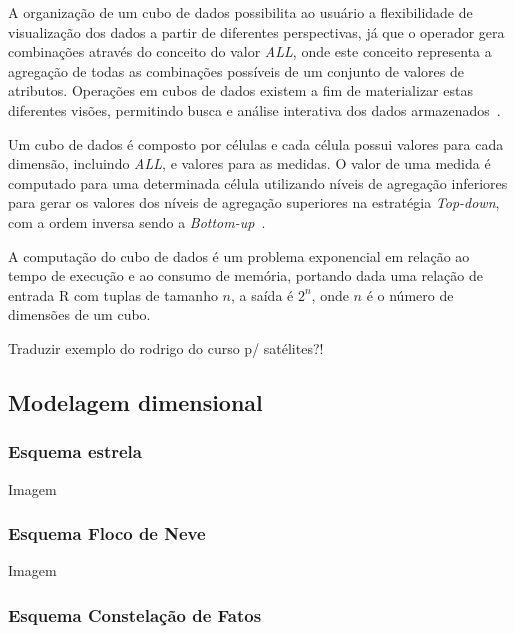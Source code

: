 A organização de um cubo de dados possibilita ao usuário a flexibilidade de visualização dos dados a partir de diferentes perspectivas, já que o operador gera combinações através do conceito do valor \textit{ALL}, onde este conceito representa a agregação de todas as combinações possíveis de um conjunto de valores de atributos.
Operações em cubos de dados existem a fim de materializar estas diferentes visões, permitindo busca e análise interativa dos dados armazenados~\cite{silva:2015:abordagensParaCubo}.

Um cubo de dados é composto por células e cada célula possui valores para cada dimensão, incluindo \textit{ALL}, e valores para as medidas.
O valor de uma medida é computado para uma determinada célula utilizando níveis de agregação inferiores para gerar os valores dos níveis de agregação superiores na estratégia \textit{Top-down}, com a ordem inversa sendo a \textit{Bottom-up}~\cite{silva:2015:abordagensParaCubo}.

A computação do cubo de dados é um problema exponencial em relação ao tempo de execução e ao consumo de memória, portando dada uma relação de entrada R com tuplas de tamanho $n$, a saída é $2^n$, onde $n$ é o número de dimensões de um cubo.

{\color{red} Traduzir exemplo do rodrigo do curso p/ satélites?!}

\subsection{Modelagem dimensional}
\label{ch:fun:cube:dimm}

\subsubsection{Esquema estrela}
\label{ch:fun:cube:dimm:star}

{\color{red} Imagem}

\subsubsection{Esquema Floco de Neve}
\label{ch:fun:cube:dimm:snow}

{\color{red} Imagem}

\subsubsection{Esquema Constelação de Fatos}
\label{ch:fun:cube:dimm:constellation}


